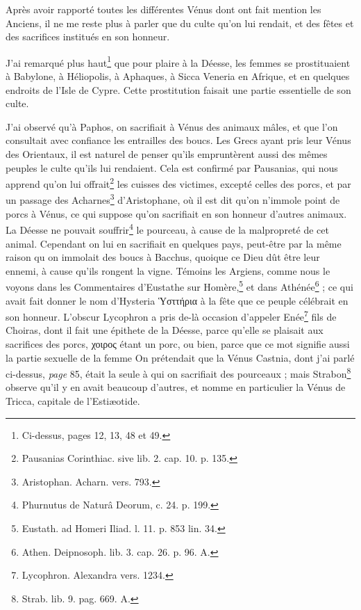\documentclass[a4paper, 11pt, oneside, polutonikogreek, french]{article}
\begin{document}
Après avoir rapporté toutes les différentes Vénus dont ont fait mention les Anciens, il ne me reste plus à parler que du culte qu'on lui rendait, et des fêtes et des sacrifices institués en son honneur.

J'ai remarqué plus haut\footnote{Ci-dessus, pages 12, 13, 48 et 49.} que pour plaire à la Déesse, les femmes se prostituaient à Babylone, à Héliopolis, à Aphaques, à Sicca Veneria en Afrique, et en quelques endroits de l'Isle de Cypre. Cette prostitution faisait une partie essentielle de son culte.

J'ai observé qu'à Paphos, on sacrifiait à Vénus des animaux mâles, et que l'on consultait avec confiance les entrailles des boucs. Les Grecs ayant pris leur Vénus des Orientaux, il est naturel de penser qu'ils empruntèrent aussi des mêmes peuples le culte qu'ils lui rendaient. Cela est confirmé par Pausanias, qui nous apprend qu'on lui offrait\footnote{Pausanias Corinthiac. sive lib. 2. cap. 10. p. 135.} les cuisses des victimes, excepté celles des porcs, et par un passage des Acharnes\footnote{Aristophan. Acharn. vers. 793.} d'Aristophane, où il est dit qu'on n'immole point de porcs à Vénus, ce qui suppose qu'on sacrifiait en son honneur d'autres animaux. La Déesse ne pouvait souffrir\footnote{Phurnutus de Naturâ Deorum, c. 24. p. 199.} le pourceau, à cause de la malpropreté de cet animal. Cependant on lui en sacrifiait en quelques pays, peut-être par la même raison qu on immolait des boucs à Bacchus, quoique ce Dieu dût être leur ennemi, à cause qu'ils rongent la vigne. Témoins les Argiens, comme nous le voyons dans les Commentaires d'Eustathe sur Homère,\footnote{Eustath. ad Homeri Iliad. l. 11. p. 853 lin. 34.} et dans Athénée\footnote{Athen. Deipnosoph. lib. 3. cap. 26. p. 96. A.} ; ce qui avait fait donner le nom d'Hysteria Ὑσττήρια à la fête que ce peuple célébrait en son honneur. L'obscur Lycophron a pris de-là occasion d'appeler Enée\footnote{Lycophron. Alexandra vers. 1234.} fils de Choiras, dont il fait une épithete de la Déesse, parce qu'elle se plaisait aux sacrifices des porcs, χοιρος étant un porc, ou bien, parce que ce mot signifie aussi la partie sexuelle de la femme On prétendait que la Vénus Castnia, dont j'ai parlé ci-dessus, \emph{page} 85, était la seule à qui on sacrifiait des pourceaux ; mais Strabon\footnote{Strab. lib. 9. pag. 669. A.} observe qu'il y en avait beaucoup d'autres, et nomme en particulier la Vénus de Tricca, capitale de l'Estiæotide.
\end{document}
